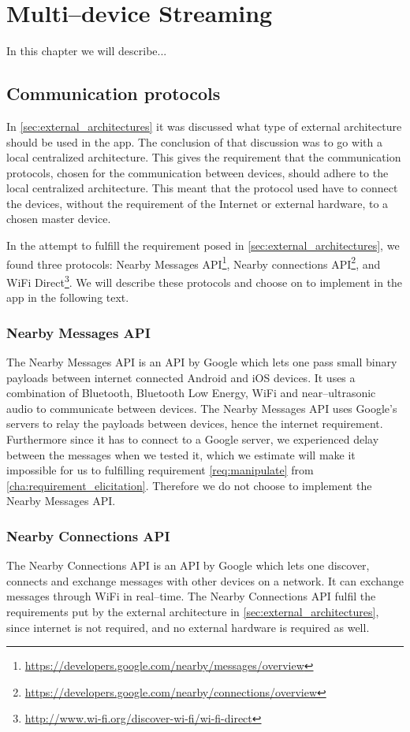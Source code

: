 \chapter{Multi--device Streaming}
In this chapter we will describe...

\section{Communication protocols}
In \cref{sec:external_architectures} it was discussed what type of external architecture should be used in the app.
The conclusion of that discussion was to go with a local centralized architecture.
This gives the requirement that the communication protocols, chosen for the communication between devices,
should adhere to the local centralized architecture.
This meant that the protocol used have to connect the devices, without the requirement of the Internet or external hardware, to a chosen master device.

In the attempt to fulfill the requirement posed in \cref{sec:external_architectures}, we found three protocols: Nearby Messages API\footnote{\url{https://developers.google.com/nearby/messages/overview}}, Nearby connections API\footnote{\url{https://developers.google.com/nearby/connections/overview}}, and WiFi Direct\footnote{\url{http://www.wi-fi.org/discover-wi-fi/wi-fi-direct}}.
We will describe these protocols and choose on to implement in the app in the following text.

\subsection{Nearby Messages API}
The Nearby Messages API is an API by Google which lets one pass small binary payloads between internet connected Android and iOS devices. 
It uses a combination of Bluetooth, Bluetooth Low Energy, WiFi and near--ultrasonic audio to communicate between devices.
The Nearby Messages API uses Google's servers to relay the payloads between devices, hence the internet requirement. 
Furthermore since it has to connect to a Google server, we experienced delay between the messages when we tested it,
which we estimate will make it impossible for us to fulfilling requirement \ref{req:manipulate} from \cref{cha:requirement_elicitation}.
Therefore we do not choose to implement the Nearby Messages API.\cite{nearby_messages}

\subsection{Nearby Connections API}
The Nearby Connections API is an API by Google which lets one discover, connects and exchange messages with other devices on a network. 
It can exchange messages through WiFi in real--time.\cite{nearby_connection} 
The Nearby Connections API fulfil the requirements put by the external architecture in \cref{sec:external_architectures},
since internet is not required, and no external hardware is required as well.

